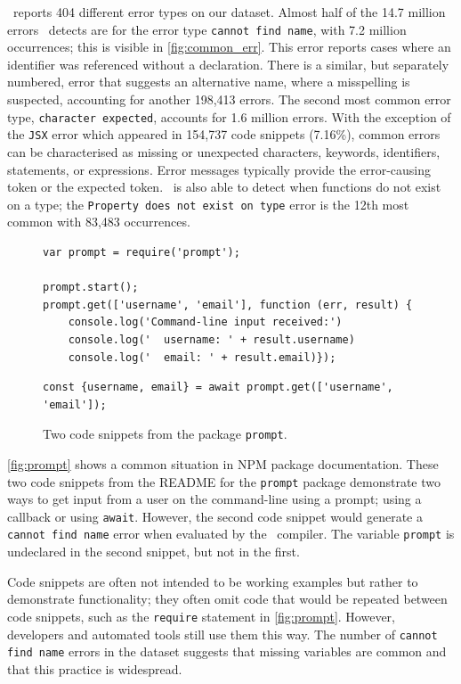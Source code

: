 \documentclass[conference]{IEEEtran}
\begin{document}
\ts\ reports 404 different error types on our dataset. Almost half of the 14.7 million errors \ts\ detects are for the error type \texttt{cannot find name}, with 7.2 million occurrences; this is visible in \autoref{fig:common_err}. This error reports cases where an identifier was referenced without a declaration. There is a similar, but separately numbered, error that suggests an alternative name, where a misspelling is suspected, accounting for another 198,413 errors. The second most common error type, \texttt{character expected}, accounts for 1.6 million errors. With the exception of the \texttt{JSX} error which appeared in 154,737 code snippets (7.16\%), common errors can be characterised as missing or unexpected characters, keywords, identifiers, statements, or expressions. Error messages typically provide the error-causing token or the expected token. \ts\ is also able to detect when functions do not exist on a type; the \texttt{Property does not exist on type} error is the 12th most common with 83,483 occurrences.

\begin{figure}[h]
    \begin{lstlisting}
var prompt = require('prompt');

prompt.start();
prompt.get(['username', 'email'], function (err, result) {
    console.log('Command-line input received:')
    console.log('  username: ' + result.username)
    console.log('  email: ' + result.email)});
    \end{lstlisting}
    \begin{lstlisting}
const {username, email} = await prompt.get(['username', 'email']);
    \end{lstlisting}
    \caption{Two code snippets from the package \texttt{prompt}.
    }
    \label{fig:prompt}
\end{figure}

\autoref{fig:prompt} shows a common situation in NPM package documentation. These two code snippets from the README for the \texttt{prompt} package demonstrate two ways to get input from a user on the command-line using a prompt; using a callback or using \texttt{await}. However, the second code snippet would generate a \texttt{cannot find name} error when evaluated by the \ts\ compiler. The variable \texttt{prompt} is undeclared in the second snippet, but not in the first.

Code snippets are often not intended to be working examples but rather to demonstrate functionality; they often omit code that would be repeated between code snippets, such as the \texttt{require} statement in \autoref{fig:prompt}. However, developers and automated tools still use them this way. The number of \texttt{cannot find name} errors in the dataset suggests that missing variables are common and that this practice is widespread.
\end{document}
